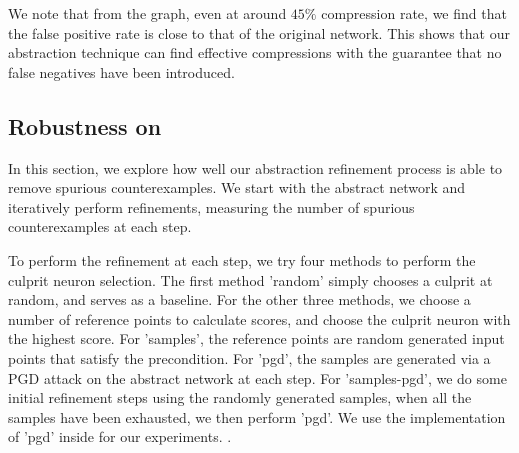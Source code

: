 We note that from the graph, even at around $45\%$ compression rate,
we find that the false positive rate is close to that of the original network.
This shows that our abstraction technique can find effective compressions with
the guarantee that no false negatives have been introduced. 

\subsection{Robustness on \mnist}
\label{s:exp-mnist-rob}

In this section, we explore how well our abstraction refinement process is able
to remove spurious counterexamples. We start with the abstract network and
iteratively perform refinements, measuring the number of spurious
counterexamples at each step. 

To perform the refinement at each step, we try four methods to
perform the culprit neuron selection. The first method 'random' simply chooses a
culprit at random, and serves as a baseline. For the other three methods, we
choose a number of reference points to calculate scores, and choose the culprit
neuron with the highest score. For 'samples', the reference points are random
generated input points that satisfy the precondition. For 'pgd', the samples are
generated via a PGD \cite{pgd, pgd-attack} attack on the abstract network at each step. For
'samples-pgd', we do some initial refinement steps using the randomly generated
samples, when all the samples have been exhausted, we then perform 'pgd'. We use
the implementation of 'pgd' inside \abcrown for our experiments. .

